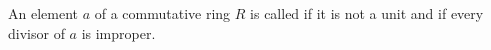 An element $a$ of a commutative ring $R$ is called  if it is not a unit and if every divisor of $a$ is improper.
